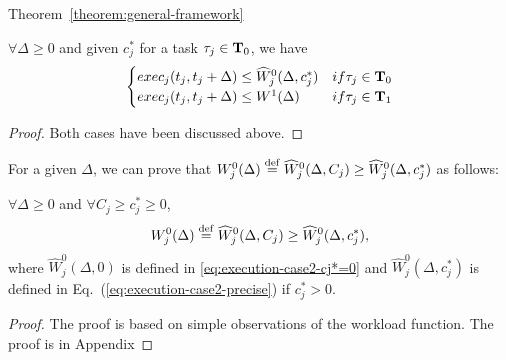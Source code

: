 \begin{appProof}{Theorem~\ref{theorem:general-framework}}
\begin{Lemma}
\label{lemma:Wj01-exact}
$\forall \Delta \geq 0$ and given $c_j^*$ for a task $\tau_j \in {\bf T}_0$, we have 
\[
\begin{cases}
exec_j(t_j, t_j+\Delta) \leq \widehat{W}_j^0(\Delta, c_j^*) &\mbox{ if } \tau_j \in {\bf T}_0\\  
exec_j(t_j, t_j+\Delta) \leq W^1(\Delta) &\mbox{ if } \tau_j \in {\bf T}_1  
 \end{cases}
\]
\end{Lemma}
\begin{proof}
  Both cases have been discussed above.
\end{proof}
For a given $\Delta$, we can prove that $W_j^0(\Delta)\equals \widehat{W}_j^0(\Delta, C_j) \geq \widehat{W}_j^0(\Delta, c_j^*)$ as follows:
\begin{Lemma}
\label{lemma:Wj0-dominate}
$\forall \Delta \geq 0$ and $\forall C_j\geq c_j^* \geq 0$,
\[
W_j^0(\Delta)\equals \widehat{W}_j^0(\Delta, C_j)  \geq \widehat{W}_j^0(\Delta, c_j^*),
\]
where $\widehat{W}_j^0(\Delta, 0)$ is defined in \eqref{eq:execution-case2-cj*=0}  and
$\widehat{W}_j^0(\Delta, c_j^*)$ is defined in Eq.~(\ref{eq:execution-case2-precise}) if $c_j^* > 0$.
\end{Lemma}
\begin{proof}
 The proof is based on simple observations of the workload function. The proof is in Appendix
\end{proof}





\end{appProof}
